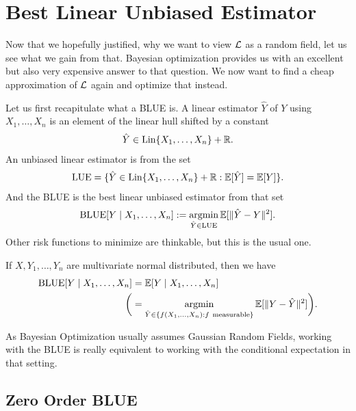 \section{Best Linear Unbiased Estimator}

Now that we hopefully justified, why we want to view \(\mathcal{L}\) as a random field,
let us see what we gain from that. Bayesian optimization provides us with
an excellent but also very expensive answer to that question. We now want to
find a cheap approximation of \(\mathcal{L}\) again and optimize that instead.

Let us first recapitulate what a BLUE is. A linear estimator \(\hat{Y}\) of
\(Y\) using \(X_1,\dots,X_n\) is an element of the linear hull shifted by a
constant 
\begin{align*}
	\hat{Y}\in \operatorname{Lin}\{X_1,\dots,X_n\} + \mathbb{R}.
\end{align*}
An unbiased linear estimator is from the set
\begin{align*}
	\operatorname{LUE} = \{ \hat{Y} \in \operatorname{Lin}\{X_1,\dots,X_n\} + \mathbb{R} : \mathbb{E}[\hat{Y}] = \mathbb{E}[Y]\}.
\end{align*}
And the BLUE is the best linear unbiased estimator from that set
\begin{align*}
	\operatorname{BLUE}[Y\mid X_1,\dots, X_n] := \operatorname*{argmin}_{\hat{Y}\in\operatorname{LUE}} \mathbb{E}[\|\hat{Y} - Y\|^2].
\end{align*}
Other risk functions to minimize are thinkable, but this is the usual one.
\begin{lemma}\label{lem: blue is cond. expectation}
	If \(X,Y_1,\dots, Y_n\) are multivariate normal distributed, then we
	have
	\begin{align*}
		\operatorname{BLUE}[Y\mid X_1,\dots,X_n]
		&= \mathbb{E}[Y\mid X_1,\dots, X_n]\\
		\bigg(&=
		\operatorname*{argmin}_{\hat{Y}\in\{f(X_1,\dots, X_n):f\ \text{measurable}\}} \mathbb{E}[\|Y-\hat{Y}\|^2]
		\bigg).
	\end{align*}
\end{lemma}
\begin{remark}
	As Bayesian Optimization usually assumes Gaussian Random Fields, working with
	the BLUE is really equivalent to working with the conditional expectation in
	that setting.
\end{remark}

\subsection{Zero Order BLUE}

